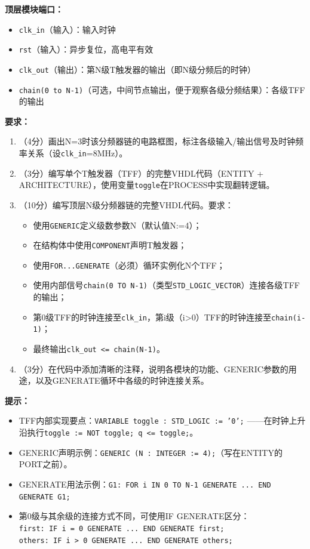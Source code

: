 \textbf{顶层模块端口：}
\begin{itemize}
  \item \texttt{clk\_in}（输入）：输入时钟
  \item \texttt{rst}（输入）：异步复位，高电平有效
  \item \texttt{clk\_out}（输出）：第N级T触发器的输出（即N级分频后的时钟）
  \item \texttt{chain(0 to N-1)}（可选，中间节点输出，便于观察各级分频结果）：各级TFF的输出
\end{itemize}

\vspace{0.3cm}

\textbf{要求：}
\begin{enumerate}[label=(\arabic*)]
  \item （4分）画出N=3时该分频器链的电路框图，标注各级输入/输出信号及时钟频率关系（设\texttt{clk\_in}=8MHz）。
  \item （3分）编写单个T触发器（TFF）的完整VHDL代码（ENTITY + ARCHITECTURE），使用变量\texttt{toggle}在PROCESS中实现翻转逻辑。
  \item （10分）编写顶层N级分频器链的完整VHDL代码。要求：
  \begin{itemize}
    \item 使用\texttt{GENERIC}定义级数参数N（默认值N:=4）；
    \item 在结构体中使用\texttt{COMPONENT}声明T触发器；
    \item 使用\texttt{FOR...GENERATE}（必须）循环实例化N个TFF；
    \item 使用内部信号\texttt{chain(0 TO N-1)}（类型\texttt{STD\_LOGIC\_VECTOR}）连接各级TFF的输出；
    \item 第0级TFF的时钟连接至\texttt{clk\_in}，第i级（i>0）TFF的时钟连接至\texttt{chain(i-1)}；
    \item 最终输出\texttt{clk\_out <= chain(N-1)}。
  \end{itemize}
  \item （3分）在代码中添加清晰的注释，说明各模块的功能、GENERIC参数的用途，以及GENERATE循环中各级的时钟连接关系。
\end{enumerate}

\begin{framed}
\textbf{提示：}
\begin{itemize}
  \item TFF内部实现要点：\texttt{VARIABLE toggle : STD\_LOGIC := '0';} ——在时钟上升沿执行\texttt{toggle := NOT toggle; q <= toggle;}。
  \item GENERIC声明示例：\texttt{GENERIC (N : INTEGER := 4);}（写在ENTITY的PORT之前）。
  \item GENERATE用法示例：\texttt{G1: FOR i IN 0 TO N-1 GENERATE ... END GENERATE G1;}
  \item 第0级与其余级的连接方式不同，可使用IF GENERATE区分：\\
  \texttt{first: IF i = 0 GENERATE ... END GENERATE first;}\\
  \texttt{others: IF i > 0 GENERATE ... END GENERATE others;}
\end{itemize}
\end{framed}

